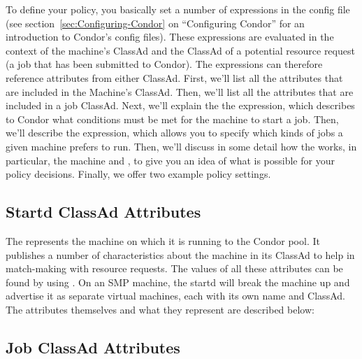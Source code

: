 To define your policy, you basically set a number of expressions in
the config file (see section~\ref{sec:Configuring-Condor} on
``Configuring Condor'' for an introduction to Condor's config files).
These expressions are evaluated in the context of the machine's ClassAd
and the ClassAd of a potential resource request (a job that has been
submitted to Condor).
The expressions can therefore reference attributes from either
ClassAd. 
First, we'll list all the attributes that are included in the Machine's
ClassAd.
Then, we'll list all the attributes that are included in a job
ClassAd. 
Next, we'll explain the the  expression, which describes
to Condor what conditions must be met for the machine to start a job.
Then, we'll describe the  expression, which allows you to
specify which kinds of jobs a given machine prefers to run.
Then, we'll discuss in some detail how the  works, in
particular, the machine  and , to give
you an idea of what is possible for your policy decisions.
Finally, we offer two example policy settings.

\subsection{\label{sec:Startd-Attributes}
Startd ClassAd Attributes}

The  represents the machine on which it is running to
the Condor pool.  It publishes a number of characteristics about the
machine in its ClassAd to help in match-making with resource requests.
The values of all these attributes can be found by using
.
On an SMP machine, the startd will break the machine up and advertise
it as separate virtual machines, each with its own name and ClassAd.
The attributes themselves and what they represent are described below:



\subsection{\label{sec:Job-Attributes}
Job ClassAd Attributes}



